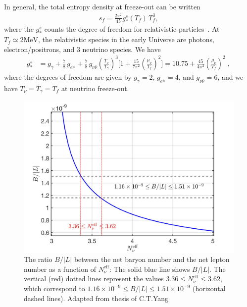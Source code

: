 In general, the total entropy density at freeze-out can be written
\begin{align}
\label{Entropy_density}
s_f=\frac{2\pi^2}{45}g^s_\ast(T_f)\,T_f^3,
\end{align}
where the $g^s_\ast$ counts the degree of freedom for relativistic particles~\cite{Kolb:1990vq}. At $T_f\simeq 2\mathrm{MeV}$, the relativistic species in the early Universe are photons, electron/positrons, and $3$ neutrino species. We have
\begin{align}
g^s_{\ast}&= g_\gamma+\frac{7}{8}\,g_{e^\pm}+\frac{7}{8}\,g_{\nu\bar{\nu}}\left(\frac{T_\nu}{T_\gamma}\right)^{\!\!3}\bigg[1+\frac{15}{7\pi^2}\left(\frac{\mu_\nu}{T_f}\right)^{\!\!2}\bigg]=10.75+\frac{45}{4\pi^2}\left(\frac{\mu_\nu}{T_f}\right)^{\!\!2}\;,
\end{align}
where the degrees of freedom are given by $g_\gamma=2$, $g_{e^\pm}=4$, and $g_{\nu\bar{\nu}}=6$, and we have $T_\nu=T_\gamma=T_f$ at neutrino freeze-out.

\begin{figure}
\begin{center}
\includegraphics[width=\textwidth]{./plots/Ratio_BL}
\caption{The ratio $B/|L|$ between the net baryon number and the net lepton number as a function of $N^{\mathrm{eff}}_\nu$: The solid blue line shows $B/|L|$. The vertical (red) dotted lines represent the values $3.36\leqslant N_\nu^{\mathrm{eff}}\leqslant3.62$, which correspond to $1.16 \times 10^{-9}\leqslant B/|L|\leqslant 1.51 \times 10^{-9}$ (horizontal dashed lines). Adapted from thesis of C.T.Yang \cite{Yang:2024ret}}
\label{BL_Ratio}
\end{center}
\end{figure}

